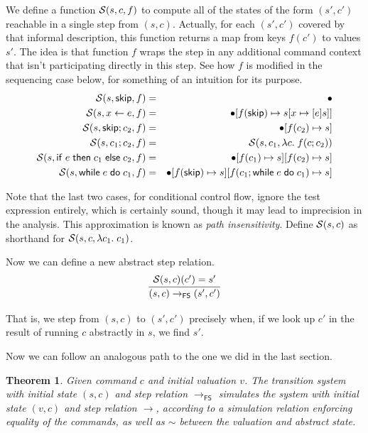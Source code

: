 \documentclass{amsbook}
\newtheorem{theorem}{Theorem}[chapter]
\theoremstyle{definition}
\theoremstyle{remark}
\numberwithin{section}{chapter}
\numberwithin{equation}{chapter}
\begin{document}
We define a function $\mathcal S(s, c, f)$ to compute all of the states of the form $(s', c')$ reachable in a single step from $(s, c)$.
Actually, for each $(s', c')$ covered by that informal description, this function returns a map from keys $f(c')$ to values $s'$.
The idea is that function $f$ wraps the step in any additional command context that isn't participating directly in this step.
See how $f$ is modified in the sequencing case below, for something of an intuition for its purpose.
\begin{eqnarray*}
  \mathcal S(s, \mathsf{skip}, f) &=& \bullet \\
  \mathcal S(s, x \leftarrow e, f) &=& \bullet[f(\mathsf{skip}) \mapsto s[x \mapsto [e]s]] \\
  \mathcal S(s, \mathsf{skip}; c_2, f) &=& \bullet[f(c_2) \mapsto s] \\
  \mathcal S(s, c_1; c_2, f) &=& \mathcal S(s, c_1, \lambda c. \; f(c; c_2)) \\
  \mathcal S(s, \mathsf{if} \; e \; \mathsf{then} \; c_1 \; \mathsf{else} \; c_2, f) &=& \bullet[f(c_1) \mapsto s][f(c_2) \mapsto s] \\
  \mathcal S(s, \mathsf{while} \; e \; \mathsf{do} \; c_1, f) &=& \bullet[f(\mathsf{skip}) \mapsto s][f(c_1; \mathsf{while} \; e \; \mathsf{do} \; c_1) \mapsto s]
\end{eqnarray*}

Note that the last two cases, for conditional control flow, ignore the test expression entirely, which is certainly sound, though it may lead to imprecision in the analysis.
This approximation is known as \emph{path insensitivity}.
Define $\mathcal S(s, c)$ as shorthand for $\mathcal S(s, c, \lambda c_1. \; c_1)$.

Now we can define a new abstract step relation.
$$\infer{(s, c) \to_\mathsf{FS} (s', c')}{
  \absstepo{s}{c}(c') = s'
}$$

That is, we step from $(s, c)$ to $(s', c')$ precisely when, if we look up $c'$ in the result of running $c$ abstractly in $s$, we find $s'$.

Now we can follow an analogous path to the one we did in the last section.

\begin{theorem}\label{flow_sensitive_abstraction}
  \abstraction
  Given command $c$ and initial valuation $v$.  The transition system with initial state $(s, c)$ and step relation $\to_\mathsf{FS}$ simulates the system with initial state $(v, c)$ and step relation $\to$, according to a simulation relation enforcing equality of the commands, as well as $\sim$ between the valuation and abstract state.
\end{theorem}
\end{document}
